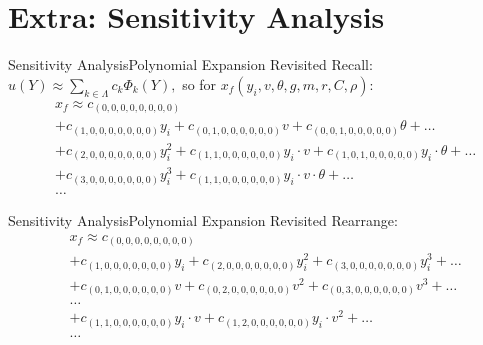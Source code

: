 \documentclass{beamer}
\begin{document}
\section{Extra: Sensitivity Analysis}
\begin{frame}{Sensitivity Analysis}{Polynomial Expansion Revisited}\vspace{-30pt}
Recall: $u(Y)\approx\sum_{k\in\Lambda}c_k\Phi_k(Y),$ so for $x_f(y_i,v,\theta,g,m,r,C,\rho)$:
\begin{align*}
&x_f \approx c_{(0,0,0,0,0,0,0,0)} \\
 &+c_{(1,0,0,0,0,0,0,0)}y_i + c_{(0,1,0,0,0,0,0,0)}v + c_{(0,0,1,0,0,0,0,0)}\theta+\ldots\\
 &+c_{(2,0,0,0,0,0,0,0)}y_i^2 + c_{(1,1,0,0,0,0,0,0)}y_i\cdot v + c_{(1,0,1,0,0,0,0,0)}y_i\cdot \theta +\ldots\\
 &+c_{(3,0,0,0,0,0,0,0)}y_i^3 + c_{(1,1,0,0,0,0,0,0)}y_i\cdot v\cdot\theta +\ldots\\
 &\ldots
\end{align*}
\end{frame}

\begin{frame}{Sensitivity Analysis}{Polynomial Expansion Revisited}\vspace{-30pt}
Rearrange:
\begin{align*}
&x_f \approx c_{(0,0,0,0,0,0,0,0)} \\
 &+c_{(1,0,0,0,0,0,0,0)}y_i + c_{(2,0,0,0,0,0,0,0)}y_i^2 + c_{(3,0,0,0,0,0,0,0)}y_i^3+\ldots\\
 &+c_{(0,1,0,0,0,0,0,0)}v + c_{(0,2,0,0,0,0,0,0)}v^2 + c_{(0,3,0,0,0,0,0,0)}v^3+\ldots\\
 &\ldots\\
 &+c_{(1,1,0,0,0,0,0,0)}y_i\cdot v + c_{(1,2,0,0,0,0,0,0)}y_i\cdot v^2+\ldots\\
 &\ldots
\end{align*}
\end{frame}
\end{document}
